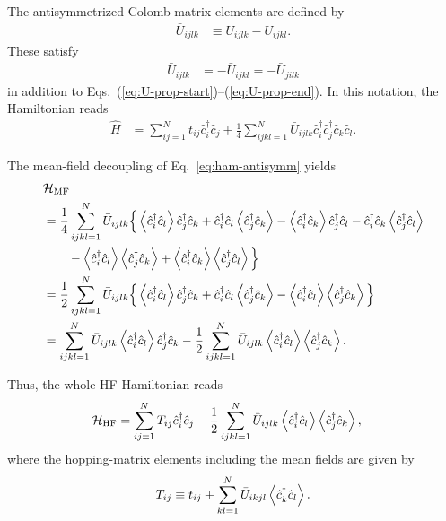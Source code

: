 \documentclass[submission, LectureNotes]{SciPost}
\newcommand{\hatc}{{\ensuremath{\hat{c}}}}
\begin{document}
The antisymmetrized Colomb matrix elements are defined by
\begin{align}
    \bar{U}_{ijlk} &\equiv U_{ijlk} - U_{ijkl}.
\end{align}
These satisfy
\begin{align}
\bar{U}_{ijlk} &= -\bar{U}_{ijkl} = -\bar{U}_{jilk}
\end{align}
in addition to Eqs.~(\ref{eq:U-prop-start})--(\ref{eq:U-prop-end}).
In this notation, the Hamiltonian reads
\begin{align}
    \hat{H} &= \sum_{ij=1}^N t_{ij} \hat{c}^\dagger_i \hat{c}_j + \frac{1}{4} \sum_{ijkl=1}^N \bar{U}_{ijlk}\hat{c}^\dagger_i \hat{c}^\dagger_j \hat{c}_k \hat{c}_l.\label{eq:ham-antisymm}
\end{align}

The mean-field decoupling of Eq.~\eqref{eq:ham-antisymm} yields
\begin{align}
& \mathcal{H}_\mathrm{MF} \nonumber \\
& = \frac{1}{4} \sum_{ijkl=1}^N \bar{U}_{ijlk}
\Big\{
\expval{\hat{c}^\dagger_i \hat{c}_l} \hat{c}^\dagger_j \hat{c}_k
+\hat{c}^\dagger_i \hat{c}_l \expval{\hat{c}^\dagger_j \hat{c}_k}
-\expval{\hat{c}^\dagger_i \hat{c}_k} \hat{c}^\dagger_j \hat{c}_l
-\hat{c}^\dagger_i \hat{c}_k \expval{\hat{c}^\dagger_j \hat{c}_l}\\
&\hspace{2em} - \expval{\hat{c}^\dagger_i \hat{c}_l} \expval{\hat{c}^\dagger_j \hat{c}_k} + \expval{\hat{c}^\dagger_i \hat{c}_k} \expval{\hat{c}^\dagger_j \hat{c}_l}
\Big\}\nonumber\\
& = \frac{1}{2} \sum_{ijkl=1}^N \bar{U}_{ijlk}
\Big\{
\expval{\hat{c}^\dagger_i \hat{c}_l} \hat{c}^\dagger_j \hat{c}_k
+\hat{c}^\dagger_i \hat{c}_l \expval{\hat{c}^\dagger_j \hat{c}_k}
-\expval{\hat{c}^\dagger_i \hat{c}_l} \expval{\hat{c}^\dagger_j \hat{c}_k} 
\Big\}\nonumber \\
&= \sum_{ijkl=1}^N \bar{U}_{ijlk}
\expval{\hat{c}^\dagger_i \hat{c}_l} \hat{c}^\dagger_j \hat{c}_k
-\frac{1}{2}\sum_{ijkl=1}^N \bar{U}_{ijlk}\expval{\hat{c}^\dagger_i \hat{c}_l} \expval{\hat{c}^\dagger_j \hat{c}_k} 
.
\end{align}

Thus, the whole HF Hamiltonian reads
\begin{align}
\mathcal{H}_\mathrm{HF} &= \sum_{ij=1}^N T_{ij} \hatc_i^\dagger \hatc_j -\frac{1}{2}\sum_{ijkl=1}^N \bar{U}_{ijlk}\expval{\hat{c}^\dagger_i \hat{c}_l} \expval{\hat{c}^\dagger_j \hat{c}_k},
\end{align}
where the hopping-matrix elements including the mean fields are given by
\begin{align}
T_{ij} \equiv t_{ij} + \sum_{kl=1}^N \bar{U}_{i k j l} \expval{\hatc^\dagger_k \hatc_l}.\label{eq:Tij}
\end{align}
\end{document}
